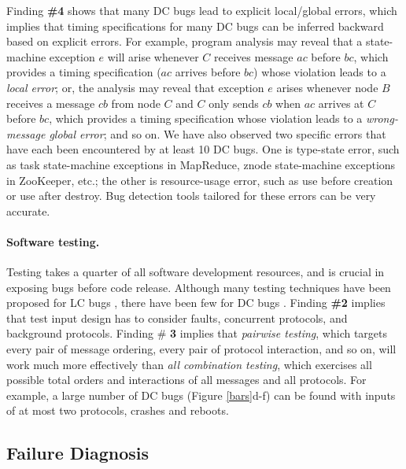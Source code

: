 Finding {\bf \#4} shows that many DC bugs lead to explicit
local/global errors, which implies that timing specifications for many
DC bugs can be inferred backward based on explicit errors.  For
example, program analysis may reveal that a state-machine exception
$e$ will arise whenever $C$ receives message $ac$ before $bc$, which
provides a timing specification ($ac$ arrives before $bc$)
whose violation leads to a {\it local error}; or, the analysis may
reveal that exception $e$ arises whenever node $B$ receives a message
$cb$ from node $C$ and $C$ only sends $cb$ when $ac$ arrives at
$C$ before $bc$, which provides a timing specification whose
violation leads to a {\it wrong-message global error}; and so on.  
We
have also observed two specific errors that have each been encountered
by at least 10 DC bugs. 
One is type-state error, such as task state-machine exceptions
in MapReduce, znode state-machine exceptions in ZooKeeper,
etc.; the
other is resource-usage error, such as use before creation or use
after destroy.  Bug detection tools tailored for these errors
can be very accurate.
\fi



\paragraph{Software testing.}

Testing takes a quarter of all software development resources,
and is crucial in exposing bugs before code
release.  Although many testing techniques have been proposed for LC
bugs \cite{madan.asplos10,
ctrigger.asplos09, racefuzzer}, there have been few for
DC bugs \cite{jcute}.
%
%
Finding {\bf \#2} implies that test input design has to consider
faults, concurrent protocols, and background protocols. Finding \#{\bf
  3} implies that {\it pairwise testing}, which targets every pair of
message ordering, every pair of protocol interaction, and so on, will
work much more effectively than {\it all combination testing}, which
exercises all possible total orders and interactions of all
messages and all protocols.
%
For example, a large number of DC bugs (Figure \ref{bars}d-f) can be 
found with inputs of at most two protocols, crashes and reboots.


\vten %

\subsection{Failure Diagnosis}
\label{less-diagnose}


